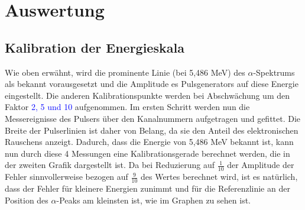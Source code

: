 \documentclass[bigchapter,colorback,accentcolor=tud4b,linedtoc,11pt]{tudreport}
\begin{document}
\chapter{Auswertung}

\section{Kalibration der Energieskala}

Wie oben erwähnt, wird die prominente Linie (bei 5,486 MeV) des
$\alpha$-Spektrums als bekannt vorausgesetzt und die Amplitude es Pulsgenerators
auf diese Energie eingestellt. Die anderen Kalibrationspunkte werden bei
Abschwächung um den Faktor \textcolor{blue}{2, 5 und 10} aufgenommen. Im ersten Schritt werden nun die
Messereignisse des Pulsers über den Kanalnummern aufgetragen und gefittet. Die
Breite der Pulserlinien ist daher von Belang, da sie den Anteil des
elektronischen Rauschens anzeigt. Dadurch, dass die Energie von 5,486 MeV
bekannt ist, kann nun durch diese 4 Messungen eine Kalibrationsgerade berechnet
werden, die in der zweiten Grafik dargestellt ist. Da bei Reduzierung auf
$\frac{1}{10}$ der Amplitude der Fehler sinnvollerweise bezogen auf
$\frac{9}{10}$ des Wertes berechnet wird, ist es natürlich, dass der Fehler für
kleinere Energien zunimmt und für die Referenzlinie an der Position des $\alpha$-Peaks am kleinsten ist, wie im Graphen zu sehen ist. 


\end{document}
